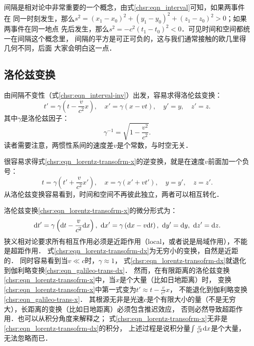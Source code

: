 间隔是相对论中非常重要的一个概念，由式\eqref{chsr:eqn_interval}可知，如果两事件在
同一时刻发生，那么$s^2=(x_1-x_0)^2+(y_1-y_0)^2+(z_1-z_0)^2>0$；如果两事件在同一地点
先后发生，那么$s^2=-c^2(t_1-t_0)^2<0$．可见时间和空间都统一在间隔这个概念里，
间隔的{\kaishu 平方}是可正可负的，这与我们通常接触的欧几里得几何不同，后面
大家会明白这一点．




 

\subsection{洛伦兹变换}\label{chsr:sec_lorentz-transofrm}
由间隔不变性（式\eqref{chsr:eqn_interval-inv}）出发，容易求得{\heiti 洛伦兹变换}：
\begin{equation}\label{chsr:eqn_lorentz-transofrm-x}
    t' = \gamma \left({t-\dfrac{v}{c^2}x}\right), \quad
    x' = \gamma \left({x-vt}\right), \quad
    y' = y, \quad
    z' = z.
\end{equation}
其中$\gamma$是洛伦兹因子：
\begin{equation}
    \gamma^{-1}=\sqrt{1-\dfrac{v^2}{c^2}}.
\end{equation}
读者需要注意，两惯性系间的速度差$v$是个常数，与时空无关．

很容易求得式\eqref{chsr:eqn_lorentz-transofrm-x}的逆变换，就是在速度$v$前面加一个负号：
\begin{equation}\label{chsr:eqn_lorentz-transofrm-x-inv}
    t = \gamma \left({t'+\dfrac{v}{c^2}x'}\right), \quad
    x = \gamma ({x'+vt'}), \quad
    y = y', \quad
    z = z'.
\end{equation}
从洛伦兹变换容易看到，时间和空间不再彼此独立，两者可以相互转化．

洛伦兹变换\eqref{chsr:eqn_lorentz-transofrm-x}的微分形式为：
\begin{equation}\label{chsr:eqn_lorentz-transofrm-dx}
	{\rm d}t' = \gamma \left({{\rm d}t-\dfrac{v}{c^2}{\rm d}x}\right), \
	{\rm d}x' = \gamma \left({{\rm d}x-v{\rm d}t}\right), \
	{\rm d}y' = {\rm d}y, \
	{\rm d}z' = {\rm d}z.
\end{equation}
狭义相对论要求所有相互作用必须是近距作用（local，或者说是局域作用），不能是超距作用．
式\eqref{chsr:eqn_lorentz-transofrm-dx}为无穷小的变换，自然是近距的．
同时容易看到当$v \ll c$时，$\gamma \approx 1$，
式\eqref{chsr:eqn_lorentz-transofrm-dx}就退化到伽利略变换\eqref{chsr:eqn_galileo-trans-dx}．
然而，在有限距离的洛伦兹变换\eqref{chsr:eqn_lorentz-transofrm-x}中，当$x$是个大量（比如日地距离）时，
变换\eqref{chsr:eqn_lorentz-transofrm-x}中第一式变为$t' \approx t-\frac{v}{c^2}x$，
不能退化到伽利略变换\eqref{chsr:eqn_galileo-trans-x}．
其根源无非是光速$c$是个有限大小的量（不是无穷大），长距离的变换（比如日地距离）必须包含推迟效应，
否则必然导致超距作用．也可以从积分角度来解释之；
式\eqref{chsr:eqn_lorentz-transofrm-x}无非是\eqref{chsr:eqn_lorentz-transofrm-dx}的积分，
上述过程是说积分量$\int \frac{v}{c^2}{\rm d}x$是个大量，无法忽略而已．


